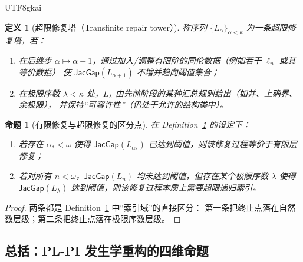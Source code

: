\documentclass[12pt]{article}
\newtheorem{definition}{定义}[section]
\newtheorem{proposition}{命题}[section]
\newcommand{\Layer}{\ensuremath{\ell}}
\newcommand{\JacGap}{\ensuremath{\mathsf{JacGap}}}
\begin{document}
\begin{CJK*}{UTF8}{gkai}
\begin{definition}[超限修复塔（Transfinite repair tower）]
\label{def:transfinite-repair-tower}
称序列 $\{L_\alpha\}_{\alpha<\kappa}$ 为一条\emph{超限修复塔}，若：
\begin{enumerate}
  \item 在后继步 $\alpha\mapsto \alpha+1$，通过加入/调整有限阶的同伦数据（例如若干 $\Layer_n$ 或其等价数据）
        使 $\JacGap(L_{\alpha+1})$ 不增并趋向阈值集合；
  \item 在极限序数 $\lambda<\kappa$ 处，$L_\lambda$ 由先前阶段的某种汇总规则给出（如并、上确界、余极限），
        并保持“可容许性”（仍处于允许的结构类中）。
\end{enumerate}
\end{definition}

\begin{proposition}[有限修复与超限修复的区分点]
\label{prop:finite-vs-transfinite-plpi}
在 Definition~\ref{def:transfinite-repair-tower} 的设定下：
\begin{enumerate}
  \item 若存在 $\alpha_\ast<\omega$ 使得 $\JacGap(L_{\alpha_\ast})$ 已达到阈值，则该修复过程等价于有限层修复；
  \item 若对所有 $n<\omega$，$\JacGap(L_n)$ 均未达到阈值，但存在某个极限序数 $\lambda$ 使得
        $\JacGap(L_\lambda)$ 达到阈值，则该修复过程本质上需要超限递归索引。
\end{enumerate}
\end{proposition}

\begin{proof}
两条都是 Definition~\ref{def:transfinite-repair-tower} 中“索引域”的直接区分：
第一条把终止点落在自然数层级；第二条把终止点落在极限序数层级。
\end{proof}

\subsection{总括：PL-PI 发生学重构的四维命题}


\end{CJK*}
\end{document}
